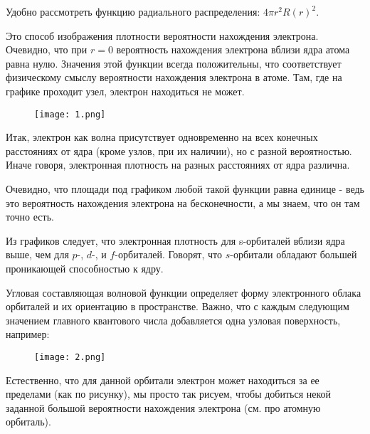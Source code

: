 Удобно рассмотреть функцию радиального распределения: $4\pi r^2 R(r)^2$.

\par\smallskip

Это способ изображения плотности вероятности нахождения
электрона. Очевидно, что при $r=0$ вероятность нахождения
электрона вблизи ядра атома равна нулю. Значения этой функции
всегда положительны, что соответствует физическому смыслу
вероятности нахождения электрона в атоме. Там, где на графике
проходит узел, электрон находиться не может.

\par\smallskip

\begin{figure}[h]
\centering
{\texttt{[image: 1.png]}}

\end{figure}


\par\smallskip
	
Итак, электрон как волна присутствует одновременно на всех
конечных расстояниях от ядра (кроме узлов, при их наличии), но с
разной вероятностью. Иначе говоря, электронная плотность на
разных расстояниях от ядра различна.	

\par\smallskip
	
Очевидно, что площади под графиком любой такой функции равна
единице - ведь это вероятность нахождения электрона на
бесконечности, а мы знаем, что он там точно есть.

\par\smallskip
	
Из графиков следует, что электронная плотность для s-орбиталей
вблизи ядра выше, чем для $p$-, $d$-, и $f$-орбиталей. Говорят, что $s$-орбитали обладают большей проникающей способностью к ядру.	

\par\smallskip
	
Угловая составляющая волновой функции определяет форму
электронного облака орбиталей и их ориентацию в пространстве.
Важно, что с каждым следующим значением главного квантового
числа добавляется одна узловая поверхность, например:

\par\smallskip

\begin{figure}[h]
\centering
 {\texttt{[image: 2.png]}}
\end{figure}

\par\smallskip


Естественно, что для данной орбитали электрон может находиться
за ее пределами (как по рисунку), мы просто так рисуем, чтобы
добиться некой заданной большой вероятности нахождения
электрона (см. про атомную орбиталь).	

\par\bigskip
\par\bigskip
	